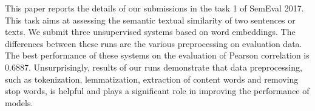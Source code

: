 This paper reports the details of our submissions in the task 1 of SemEval 2017. This task aims at assessing the semantic textual similarity of two sentences or texts. We submit three unsupervised systems based on word embeddings. The differences between these runs are the various preprocessing on evaluation data. The best performance of these systems on the evaluation of Pearson correlation is 0.6887. Unsurprisingly, results of our runs demonstrate that data preprocessing, such as tokenization, lemmatization, extraction of content words and removing stop words, is helpful and plays a significant role in improving the performance of models.
